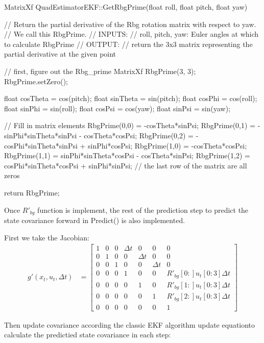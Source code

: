 \documentclass[letterpaper]{article}
\begin{document}
\begin{CPP}
MatrixXf QuadEstimatorEKF::GetRbgPrime(float roll, float pitch, float yaw)
{
    // Return the partial derivative of the Rbg rotation matrix with respect to yaw. 
    // We call this RbgPrime.
    // INPUTS: 
    //   roll, pitch, yaw: Euler angles at which to calculate RbgPrime
    // OUTPUT:
    //   return the 3x3 matrix representing the partial derivative at the given point

    // first, figure out the Rbg_prime
    MatrixXf RbgPrime(3, 3);
    RbgPrime.setZero();

    float cosTheta = cos(pitch);
    float sinTheta = sin(pitch);
    float cosPhi   = cos(roll);
    float sinPhi   = sin(roll);
    float cosPsi   = cos(yaw);
    float sinPsi   = sin(yaw);

    // Fill in matrix elements
    RbgPrime(0,0)  = -cosTheta*sinPsi;
    RbgPrime(0,1)  = -sinPhi*sinTheta*sinPsi - cosTheta*cosPsi;
    RbgPrime(0,2)  = -cosPhi*sinTheta*sinPsi + sinPhi*cosPsi;
    RbgPrime(1,0)  = -cosTheta*cosPsi;
    RbgPrime(1,1)  = sinPhi*sinTheta*cosPsi - cosTheta*sinPsi;
    RbgPrime(1,2)  = cosPhi*sinTheta*cosPsi + sinPhi*sinPsi;
    // the last row of the matrix are all zeros

    return RbgPrime;
}
\end{CPP}

Once $R'_{bg}$ function is implement, the rest of the prediction step to predict the state covariance forward in Predict() is also implemented.

First we take the Jacobian:
\begin{align}
  g'(x_t, u_t, \Delta t) &= 
      \left [ \begin{array}{ccccccc}
      1 & 0 & 0 & \Delta t & 0 & 0 & 0\\
      0 & 1 & 0 & 0 & \Delta t & 0 & 0\\
      0 & 0 & 1 & 0 & 0 & \Delta t & 0\\
      0 & 0 & 0 & 1 & 0 & 0 & R'_{bg}[0:]u_t[0:3] \Delta t\\
      0 & 0 & 0 & 0 & 1 & 0 & R'_{bg}[1:]u_t[0:3] \Delta t\\
      0 & 0 & 0 & 0 & 0 & 1 & R'_{bg}[2:]u_t[0:3] \Delta t\\
      0 & 0 & 0 & 0 & 0 & 0 & 1
    \end{array}
    \right]
\end{align}

Then update covariance according the classic EKF algorithm update equationto calculate the predictied state covariance in each step:
\end{document}
